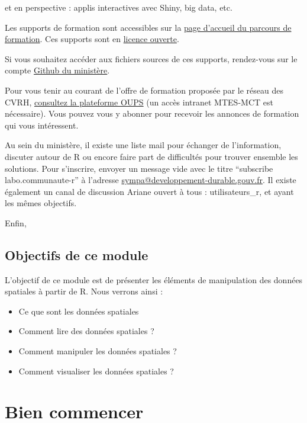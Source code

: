 \documentclass[
]{book}
\providecommand{\tightlist}{%
  \setlength{\itemsep}{0pt}\setlength{\parskip}{0pt}}
\begin{document}
et en perspective : applis interactives avec Shiny, big data, etc.

Les supports de formation sont accessibles sur la \href{https://mtes-mct.github.io/parcours-r/}{page d'accueil du parcours de formation}. Ces supports sont en \href{https://www.etalab.gouv.fr/wp-content/uploads/2017/04/ETALAB-Licence-Ouverte-v2.0.pdf}{licence ouverte}.

Si vous souhaitez accéder aux fichiers sources de ces supports, rendez-vous sur le compte \href{https://github.com/MTES-MCT?q=parcours-r}{Github du ministère}.

Pour vous tenir au courant de l'offre de formation proposée par le réseau des CVRH, \href{http://oups-cmvrh.e2.rie.gouv.fr/}{consultez la plateforme OUPS} (un accès intranet MTES-MCT est nécessaire).
Vous pouvez vous y abonner pour recevoir les annonces de formation qui vous intéressent.

Au sein du ministère, il existe une liste mail pour échanger de l'information, discuter autour de R ou encore faire part de difficultés pour trouver ensemble les solutions.
Pour s'inscrire, envoyer un message vide avec le titre ``subscribe labo.communaute-r'' à l'adresse \href{mailto:sympa@developpement-durable.gouv.fr?subject=subscribe\%20labo.communaute-r}{sympa@developpement-durable.gouv.fr}.
Il existe également un canal de discussion Ariane ouvert à tous : utilisateurs\_r, et ayant les mêmes objectifs.

Enfin,

\hypertarget{objectifs-de-ce-module}{%
\section*{Objectifs de ce module}\label{objectifs-de-ce-module}}

L'objectif de ce module est de présenter les éléments de manipulation des données spatiales à partir de R.
Nous verrons ainsi :

\begin{itemize}
\tightlist
\item
  Ce que sont les données spatiales
\item
  Comment lire des données spatiales ?
\item
  Comment manipuler les données spatiales ?
\item
  Comment visualiser les données spatiales ?
\end{itemize}

\hypertarget{bien-commencer}{%
\chapter{Bien commencer}\label{bien-commencer}}
\end{document}
